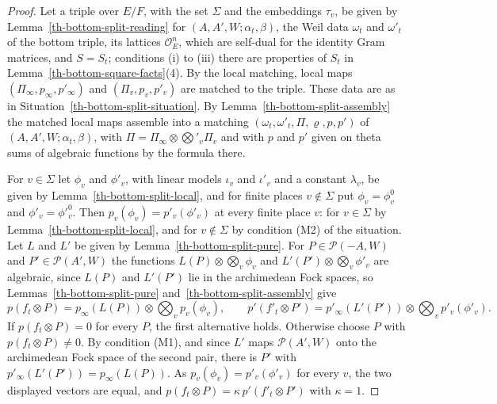 \begin{proof}
Let a triple over $E/F$, with the set $\Sigma$ and the embeddings $\tau_v$, be
given by Lemma~\ref{th-bottom-split-reading} for $(A,A',W;\alpha_t,\beta)$, the
Weil data $\omega_t$ and $\omega'_t$ of the bottom triple, its lattices
$\mathcal O_E^n$, which are self-dual for the identity Gram matrices, and
$S=S_t$; conditions (i) to (iii) there are properties of $S_t$ in
Lemma~\ref{th-bottom-square-facts}(4). By the local matching, local maps
$(\Pi_\infty,p_\infty,p'_\infty)$ and $(\Pi_v,p_v,p'_v)$ are matched to the
triple. These data are as in Situation~\ref{th-bottom-split-situation}. By
Lemma~\ref{th-bottom-split-assembly} the matched local maps assemble into a
matching $(\omega_t,\omega'_t,\Pi,\varrho,p,p')$ of $(A,A',W;\alpha_t,\beta)$,
with $\Pi=\Pi_\infty\otimes\bigotimes'_v\Pi_v$ and with $p$ and $p'$ given on
theta sums of algebraic functions by the formula there.

For $v\in\Sigma$ let $\phi_v$ and $\phi'_v$, with linear models $\iota_v$ and
$\iota'_v$ and a constant $\lambda_v$, be given by
Lemma~\ref{th-bottom-split-local}, and for finite places $v\notin\Sigma$ put
$\phi_v=\phi^0_v$ and $\phi'_v=\phi'^0_v$. Then $p_v(\phi_v)=p'_v(\phi'_v)$ at
every finite place $v$: for $v\in\Sigma$ by Lemma~\ref{th-bottom-split-local},
and for $v\notin\Sigma$ by condition (M2) of the situation. Let $L$ and $L'$ be
given by Lemma~\ref{th-bottom-split-pure}. For $P\in\mathcal P(-A,W)$ and
$P'\in\mathcal P(A',W)$ the functions $L(P)\otimes\bigotimes_v\phi_v$ and
$L'(P')\otimes\bigotimes_v\phi'_v$ are algebraic, since $L(P)$ and $L'(P')$ lie
in the archimedean Fock spaces, so Lemmas~\ref{th-bottom-split-pure}
and~\ref{th-bottom-split-assembly} give
\[
p(f_t\otimes P)=p_\infty(L(P))\otimes\bigotimes_vp_v(\phi_v),\qquad
p'(f'_t\otimes P')=p'_\infty(L'(P'))\otimes\bigotimes_vp'_v(\phi'_v).
\]
If $p(f_t\otimes P)=0$ for every $P$, the first alternative holds. Otherwise
choose $P$ with $p(f_t\otimes P)\neq0$. By condition (M1), and since $L'$ maps
$\mathcal P(A',W)$ onto the archimedean Fock space of the second pair, there is
$P'$ with $p'_\infty(L'(P'))=p_\infty(L(P))$. As $p_v(\phi_v)=p'_v(\phi'_v)$ for
every $v$, the two displayed vectors are equal, and
$p(f_t\otimes P)=\kappa\,p'(f'_t\otimes P')$ with $\kappa=1$.
\end{proof}

